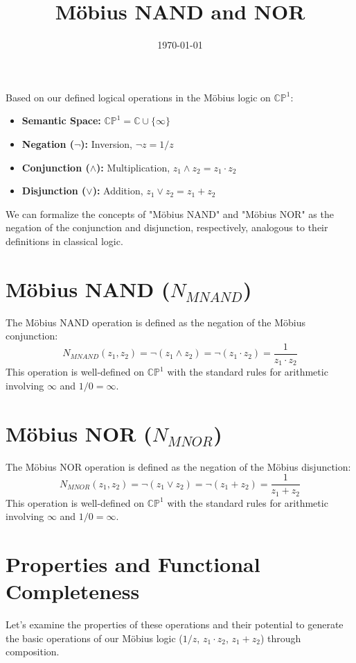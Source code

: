 \documentclass{article}
\title{Möbius NAND and NOR}
\author{}
\date{\today}
\begin{document}
	
	\maketitle
	
	Based on our defined logical operations in the M\"{o}bius logic on $\mathbb{CP}^1$:
	\begin{itemize}
		\item \textbf{Semantic Space:} $\mathbb{CP}^1 = \mathbb{C} \cup \{\infty\}$
		\item \textbf{Negation ($\neg$):} Inversion, $\neg z = 1/z$
		\item \textbf{Conjunction ($\wedge$):} Multiplication, $z_1 \wedge z_2 = z_1 \cdot z_2$
		\item \textbf{Disjunction ($\vee$):} Addition, $z_1 \vee z_2 = z_1 + z_2$
	\end{itemize}
	We can formalize the concepts of "M\"{o}bius NAND" and "M\"{o}bius NOR" as the negation of the conjunction and disjunction, respectively, analogous to their definitions in classical logic.
	
	\section{Möbius NAND ($N_{MNAND}$)}
	
	The M\"{o}bius NAND operation is defined as the negation of the M\"{o}bius conjunction:
	$$N_{MNAND}(z_1, z_2) = \neg(z_1 \wedge z_2) = \neg(z_1 \cdot z_2) = \frac{1}{z_1 \cdot z_2}$$
	This operation is well-defined on $\mathbb{CP}^1$ with the standard rules for arithmetic involving $\infty$ and $1/0 = \infty$.
	
	\section{Möbius NOR ($N_{MNOR}$)}
	
	The M\"{o}bius NOR operation is defined as the negation of the M\"{o}bius disjunction:
	$$N_{MNOR}(z_1, z_2) = \neg(z_1 \vee z_2) = \neg(z_1 + z_2) = \frac{1}{z_1 + z_2}$$
	This operation is well-defined on $\mathbb{CP}^1$ with the standard rules for arithmetic involving $\infty$ and $1/0 = \infty$.
	
	\section{Properties and Functional Completeness}
	
	Let's examine the properties of these operations and their potential to generate the basic operations of our M\"{o}bius logic ($1/z$, $z_1 \cdot z_2$, $z_1 + z_2$) through composition.
	
\end{document}

